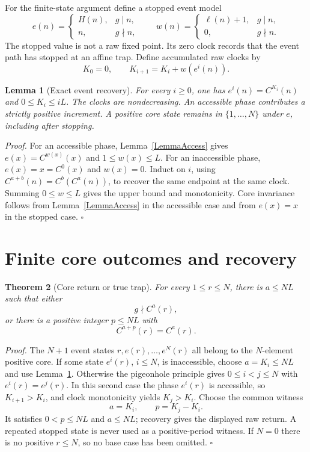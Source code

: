 \documentclass[11pt,letterpaper]{article}
\newtheorem{theorem}{Theorem}
\newtheorem{lemma}[theorem]{Lemma}
\newenvironment{proof}{\noindent\textit{Proof.}}{\hfill\(\square\)}
\begin{document}
For the finite-state argument define a stopped event model
\[
 e(n)=\begin{cases}H(n),&g\mid n,\\ n,&g\nmid n,\end{cases}
 \qquad
 w(n)=\begin{cases}\ell(n)+1,&g\mid n,\\0,&g\nmid n.\end{cases}
\]
The stopped value is not a raw fixed point. Its zero clock records that the
event path has stopped at an affine trap. Define accumulated raw clocks by
\[
 K_0=0,\qquad K_{i+1}=K_i+w(e^i(n)).
\]

\begin{lemma}[Exact event recovery]\label{LemmaRecovery}
For every $i\ge0$, one has $e^i(n)=C^{K_i}(n)$ and $0\le K_i\le iL$.
The clocks are nondecreasing. An accessible phase contributes a strictly
positive increment. A positive core state remains in $\{1,\ldots,N\}$ under
$e$, including after stopping.
\end{lemma}

\begin{proof}
For an accessible phase, Lemma~\ref{LemmaAccess} gives
$e(x)=C^{w(x)}(x)$ and $1\le w(x)\le L$. For an inaccessible phase,
$e(x)=x=C^0(x)$ and $w(x)=0$. Induct on $i$, using
$C^{a+b}(n)=C^b(C^a(n))$, to recover the same endpoint at the same clock.
Summing $0\le w\le L$ gives the upper bound and monotonicity.
Core invariance follows from Lemma~\ref{LemmaAccess} in the accessible case
and from $e(x)=x$ in the stopped case.
\end{proof}

\section{Finite core outcomes and recovery}

\begin{theorem}[Core return or true trap]\label{TheoremCore}
For every $1\le r\le N$, there is $a\le NL$ such that either
\[
 g\nmid C^a(r),
\]
or there is a positive integer $p\le NL$ with
\[
 C^{a+p}(r)=C^a(r).
\]
\end{theorem}

\begin{proof}
The $N+1$ event states $r,e(r),\ldots,e^N(r)$ all belong to the $N$-element
positive core. If some state $e^i(r)$, $i\le N$, is inaccessible, choose
$a=K_i\le NL$ and use Lemma~\ref{LemmaRecovery}.
Otherwise the pigeonhole principle gives $0\le i<j\le N$ with
$e^i(r)=e^j(r)$. In this second case the phase $e^i(r)$ is accessible, so
$K_{i+1}>K_i$, and clock monotonicity yields $K_j>K_i$.
Choose the common witness
\[
 a=K_i,\qquad p=K_j-K_i.
\]
It satisfies $0<p\le NL$ and $a\le NL$; recovery gives the displayed raw
return. A repeated stopped state is never used as a positive-period witness.
If $N=0$ there is no positive $r\le N$, so no base case has been omitted.
\end{proof}
\end{document}

